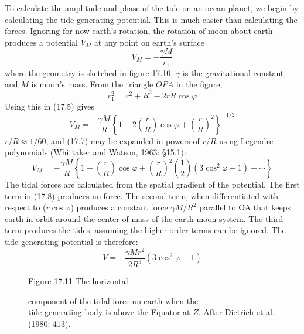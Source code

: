 To calculate the amplitude and phase of the tide on an ocean planet, we begin by calculating the tide-generating potential. This is much easier than calculating the forces. Ignoring for now earth's rotation, the rotation of moon about earth produces a potential $V_M$ at any point on earth's surface
\begin{equation}
V_{M} = -\frac{\gamma M}{r_{1}}
\end{equation}
where the geometry is sketched in figure 17.10, $\gamma $ is the gravitational constant, and $M$ is moon's mass. From the triangle $OPA$ in the figure, 
\begin{equation}
r_{1}^{2} = r^{2} + R^{2} - 2 r R \cos \varphi
\end{equation}
Using this in (17.5) gives
\begin{equation}
V_{M} = -\frac{\gamma M}{R} \left\{ 1 - 2 \left(\frac{r}{R}\right) \cos \varphi +
\left(\frac{r}{R}\right)^{2}\right\}^{-1/2}
\end{equation}
$r/R \approx 1/60$, and (17.7) may be expanded in powers of $r/R$ using
Legendre polynomials (Whittaker and Watson, 1963: \S 15.1):
\begin{equation}
V_M = -\frac{\gamma M}{R} \left\{1+\left(\frac{r}{R}\right) \cos \varphi +
\left(\frac{r}{R}\right)^2 \left(\frac{1}{2}\right) (3\cos ^2 \varphi - 1) + \cdots
\right\}
\end{equation}
The tidal forces are calculated from the spatial gradient of the potential. The first term in (17.8) produces no force. The second term, when differentiated with respect to ($r \cos \varphi $) produces a constant force $\gamma M/R^{2}$ parallel to OA that keeps earth in orbit around the center of mass of the earth-moon system. The third term produces the tides, assuming the higher-order terms can be ignored. The tide-generating potential is therefore:
\begin{equation}
V= -\frac{\gamma M r^{2}}{2 R^{3}} (3 \cos ^2 \varphi - 1)
\end{equation}

\begin{figure}[t!]
\footnotesize
\centering
Figure 17.11 The horizontal \rule{0mm}{4ex}component of the tidal force on earth when the\\tide-generating body is above the Equator at $Z$. After Dietrich et al. (1980: 413).

\label{fig:horiztideforce}
\vspace{-3ex}
\end{figure}


